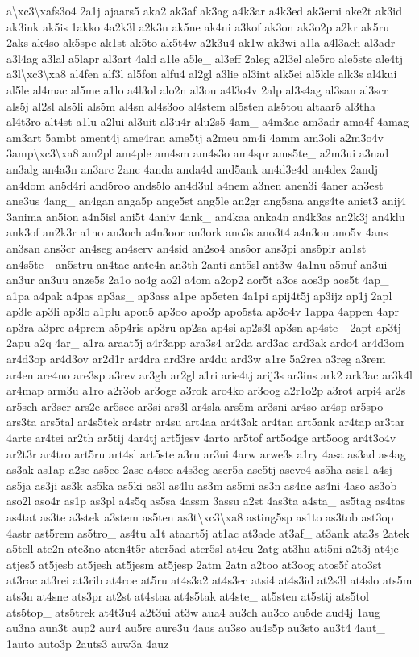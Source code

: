 \begin{DoxyCompactItemize}
a\textbackslash{}xc3\textbackslash{}xafs3o4 2a1j ajaars5 aka2 ak3af ak3ag a4k3ar a4k3ed ak3emi ake2t ak3id ak3ink ak5is 1akko 4a2k3l a2k3n ak5ne ak4ni a3kof ak3on ak3o2p a2kr ak5ru 2aks ak4so ak5spe ak1st ak5to ak5t4w a2k3u4 ak1w ak3wi a1la a4l3ach al3adr a3l4ag a3lal a5lapr al3art 4ald a1le a5le\-\_\- al3eff 2aleg a2l3el ale5ro ale5ste ale4tj a3l\textbackslash{}xc3\textbackslash{}xa8 al4fen alf3l al5fon alfu4 al2gl a3lie al3int alk5ei al5kle alk3s al4kui al5le al4mac al5me a1lo a4l3ol alo2n al3ou a4l3o4v 2alp al3s4ag al3san al3scr als5j al2sl als5li als5m al4sn al4s3oo al4stem al5sten als5tou altaar5 al3tha al4t3ro alt4st a1lu a2lui al3uit al3u4r alu2s5 4am\-\_\- a4m3ac am3adr ama4f 4amag am3art 5ambt ament4j ame4ran ame5tj a2meu am4i 4amm am3oli a2m3o4v 3amp\textbackslash{}xc3\textbackslash{}xa8 am2pl am4ple am4sm am4s3o am4spr ams5te\-\_\- a2m3ui a3nad an3alg an4a3n an3arc 2anc 4anda anda4d and5ank an4d3e4d an4dex 2andj an4dom an5d4ri and5roo ands5lo an4d3ul a4nem a3nen anen3i 4aner an3est ane3us 4ang\-\_\- an4gan anga5p ange5st ang5le an2gr ang5sna angs4te aniet3 anij4 3anima an5ion a4n5isl ani5t 4aniv 4ank\-\_\- an4kaa anka4n an4k3as an2k3j an4klu ank3of an2k3r a1no an3och a4n3oor an3ork ano3s ano3t4 a4n3ou ano5v 4ans an3san ans3cr an4seg an4serv an4sid an2so4 ans5or ans3pi ans5pir an1st an4s5te\-\_\- an5stru an4tac ante4n an3th 2anti ant5sl ant3w 4a1nu a5nuf an3ui an3ur an3uu anze5s 2a1o ao4g ao2l a4om a2op2 aor5t a3os aos3p aos5t 4ap\-\_\- a1pa a4pak a4pas ap3as\-\_\- ap3ass a1pe ap5eten 4a1pi apij4t5j ap3ijz ap1j 2apl ap3le ap3li ap3lo a1plu apon5 ap3oo apo3p apo5sta ap3o4v 1appa 4appen 4apr ap3ra a3pre a4prem a5p4ris ap3ru ap2sa ap4si ap2s3l ap3sn ap4ste\-\_\- 2apt ap3tj 2apu a2q 4ar\-\_\- a1ra araat5j a4r3app ara3s4 ar2da ard3ac ard3ak ardo4 ar4d3om ar4d3op ar4d3ov ar2d1r ar4dra ard3re ar4du ard3w a1re 5a2rea a3reg a3rem ar4en are4no are3sp a3rev ar3gh ar2gl a1ri arie4tj arij3s ar3ins ark2 ark3ac ar3k4l ar4map arm3u a1ro a2r3ob ar3oge a3rok aro4ko ar3oog a2r1o2p a3rot arpi4 ar2s ar5sch ar3scr ars2e ar5see ar3si ars3l ar4sla ars5m ar3sni ar4so ar4sp ar5spo ars3ta ars5tal ar4s5tek ar4str ar4su art4aa ar4t3ak ar4tan art5ank ar4tap ar3tar 4arte ar4tei ar2th ar5tij 4ar4tj art5jesv 4arto ar5tof art5o4ge art5oog ar4t3o4v ar2t3r ar4tro art5ru art4sl art5ste a3ru ar3ui 4arw arwe3s a1ry 4asa as3ad as4ag as3ak as1ap a2sc as5ce 2ase a4sec a4s3eg aser5a ase5tj aseve4 as5ha asis1 a4sj as5ja as3ji as3k as5ka as5ki as3l as4lu as3m as5mi as3n as4ne as4ni 4aso as3ob aso2l aso4r as1p as3pl a4s5q as5sa 4assm 3assu a2st 4as3ta a4sta\-\_\- as5tag as4tas as4tat as3te a3stek a3stem as5ten as3t\textbackslash{}xc3\textbackslash{}xa8 asting5sp as1to as3tob ast3op 4astr ast5rem as5tro\-\_\- as4tu a1t ataart5j at1ac at3ade at3af\-\_\- at3ank ata3s 2atek a5tell ate2n ate3no aten4t5r ater5ad ater5sl at4eu 2atg at3hu ati5ni a2t3j at4je atjes5 at5jesb at5jesh at5jesm at5jesp 2atm 2atn a2too at3oog atos5f ato3st at3rac at3rei at3rib at4roe at5ru at4s3a2 at4s3ec atsi4 at4s3id at2s3l at4slo ats5m ats3n at4sne ats3pr at2st at4staa at4s5tak at4ste\-\_\- at5sten at5stij ats5tol ats5top\-\_\- ats5trek at4t3u4 a2t3ui at3w aua4 au3ch au3co au5de aud4j 1aug au3na aun3t aup2 aur4 au5re aure3u 4aus au3so au4s5p au3sto au3t4 4aut\-\_\- 1auto auto3p 2auts3 auw3a 4auz 
\end{DoxyCompactItemize}
